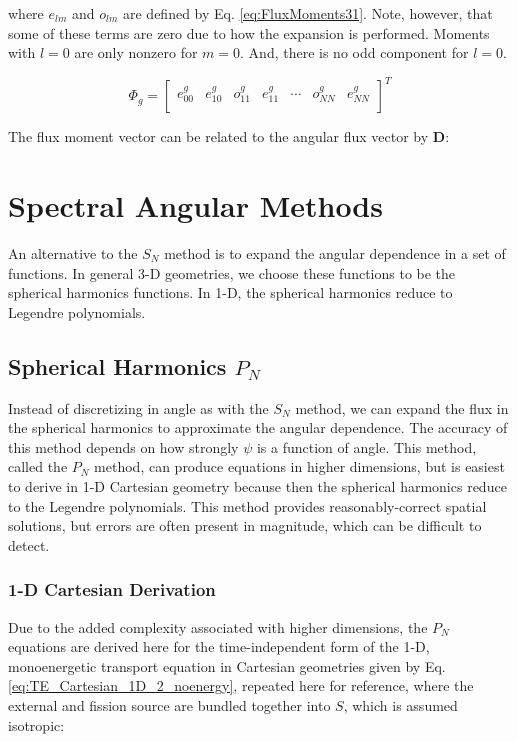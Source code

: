 \documentclass[10pt]{article}
\begin{document}
\begin{flushleft}
where \(e_{lm}\) and \(o_{lm}\) are defined by Eq. \eqref{eq:FluxMoments31}. Note, however, that some of these terms are zero due to how the expansion is performed. Moments with \(l=0\) are only nonzero for \(m=0\). And, there is no odd component for \(l=0\). 

\begin{equation}
\Phi_g=\begin{bmatrix}
e_{00}^g & e_{10}^g & o_{11}^g & e_{11}^g & \cdots & o_{NN}^g & e_{NN}^g\\
\end{bmatrix}^T
\end{equation}

The flux moment vector can be related to the angular flux vector by \(\textbf{D}\):


\clearpage
\section{Spectral Angular Methods}
An alternative to the \(S_N\) method is to expand the angular dependence in a set of functions. In general 3-D geometries, we choose these functions to be the spherical harmonics functions. In 1-D, the spherical harmonics reduce to Legendre polynomials. 


\subsection{Spherical Harmonics \(P_N\)}

Instead of discretizing in angle as with the \(S_N\) method, we can expand the flux in the spherical harmonics to approximate the angular dependence. The accuracy of this method depends on how strongly \(\psi\) is a function of angle. This method, called the \(P_N\) method, can produce equations in higher dimensions, but is easiest to derive in 1-D Cartesian geometry because then the spherical harmonics reduce to the Legendre polynomials. This method provides reasonably-correct spatial solutions, but errors are often present in magnitude, which can be difficult to detect.

\subsubsection{1-D Cartesian Derivation}

Due to the added complexity associated with higher dimensions, the \(P_N\) equations are derived here for the time-independent form of the 1-D, monoenergetic transport equation in Cartesian geometries given by Eq. \eqref{eq:TE_Cartesian_1D_2_noenergy}, repeated here for reference, where the external and fission source are bundled together into \(S\), which is assumed isotropic:


\end{flushleft}
\end{document}
